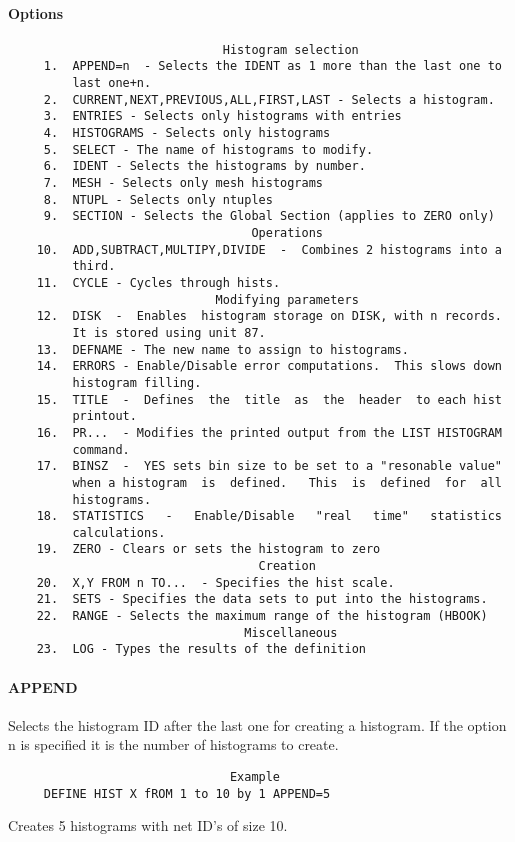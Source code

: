 \paragraph{Options      }
\begin{verbatim}
                              Histogram selection
     1.  APPEND=n  - Selects the IDENT as 1 more than the last one to
         last one+n.  
     2.  CURRENT,NEXT,PREVIOUS,ALL,FIRST,LAST - Selects a histogram. 
     3.  ENTRIES - Selects only histograms with entries 
     4.  HISTOGRAMS - Selects only histograms 
     5.  SELECT - The name of histograms to modify.  
     6.  IDENT - Selects the histograms by number.  
     7.  MESH - Selects only mesh histograms 
     8.  NTUPL - Selects only ntuples 
     9.  SECTION - Selects the Global Section (applies to ZERO only) 
                                  Operations
    10.  ADD,SUBTRACT,MULTIPY,DIVIDE  -  Combines 2 histograms into a
         third.  
    11.  CYCLE - Cycles through hists.  
                             Modifying parameters
    12.  DISK  -  Enables  histogram storage on DISK, with n records.
         It is stored using unit 87.  
    13.  DEFNAME - The new name to assign to histograms.  
    14.  ERRORS - Enable/Disable error computations.  This slows down
         histogram filling.  
    15.  TITLE  -  Defines  the  title  as  the  header  to each hist
         printout.  
    16.  PR...  - Modifies the printed output from the LIST HISTOGRAM
         command.  
    17.  BINSZ  -  YES sets bin size to be set to a "resonable value"
         when a histogram  is  defined.   This  is  defined  for  all
         histograms.  
    18.  STATISTICS   -   Enable/Disable   "real   time"   statistics
         calculations.  
    19.  ZERO - Clears or sets the histogram to zero 
                                   Creation
    20.  X,Y FROM n TO...  - Specifies the hist scale.  
    21.  SETS - Specifies the data sets to put into the histograms.  
    22.  RANGE - Selects the maximum range of the histogram (HBOOK) 
                                 Miscellaneous
    23.  LOG - Types the results of the definition 
\end{verbatim}
\paragraph{APPEND       }
Selects the histogram ID after the last one for creating a histogram.
If the option n is specified  it  is  the  number  of  histograms  to
create.  
\begin{verbatim}
                               Example
     DEFINE HIST X fROM 1 to 10 by 1 APPEND=5 
\end{verbatim}
Creates 5 histograms with net ID's of size 10.  
